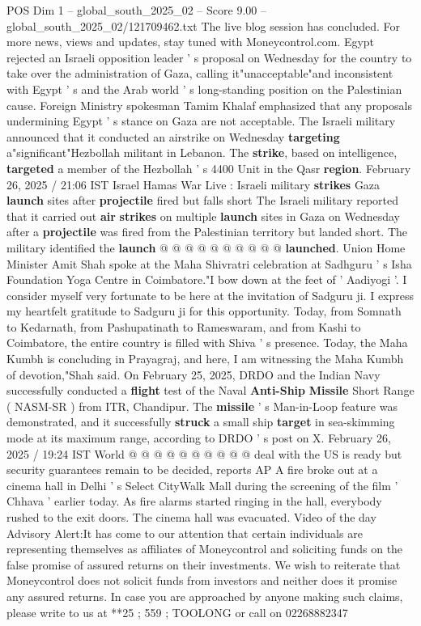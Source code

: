 \begin{textsample}{POS Dim 1 – global\_south\_2025\_02 – Score 9.00 – global\_south\_2025\_02/121709462.txt}  \label{ex:f1_pos_368}
The live blog session has concluded.
For more news, views and updates, stay tuned with Moneycontrol.com.
Egypt rejected an Israeli opposition leader ' s proposal on Wednesday for the country to take over the administration of Gaza, calling it"unacceptable"and inconsistent with Egypt ' s and the Arab world ' s long-standing position on the Palestinian cause.
Foreign Ministry spokesman Tamim Khalaf emphasized that any proposals undermining Egypt ' s stance on Gaza are not acceptable.
The Israeli military announced that it conducted an airstrike on Wednesday \textbf{targeting} a"significant"Hezbollah militant in Lebanon.
The \textbf{strike}, based on intelligence, \textbf{targeted} a member of the Hezbollah ' s 4400 Unit in the Qasr \textbf{region}.
February 26, 2025 / 21:06 IST Israel Hamas War Live : Israeli military \textbf{strikes} Gaza \textbf{launch} sites after \textbf{projectile} fired but falls short The Israeli military reported that it carried out \textbf{air} \textbf{strikes} on multiple \textbf{launch} sites in Gaza on Wednesday after a \textbf{projectile} was fired from the Palestinian territory but landed short.
The military identified the \textbf{launch} @ @ @ @ @ @ @ @ @ @ \textbf{launched}.
Union Home Minister Amit Shah spoke at the Maha Shivratri celebration at Sadhguru ' s Isha Foundation Yoga Centre in Coimbatore."I bow down at the feet of ' Aadiyogi '.
I consider myself very fortunate to be here at the invitation of Sadguru ji.
I express my heartfelt gratitude to Sadguru ji for this opportunity.
Today, from Somnath to Kedarnath, from Pashupatinath to Rameswaram, and from Kashi to Coimbatore, the entire country is filled with Shiva ' s presence.
Today, the Maha Kumbh is concluding in Prayagraj, and here, I am witnessing the Maha Kumbh of devotion,"Shah said.
On February 25, 2025, DRDO and the Indian Navy successfully conducted a \textbf{flight} test of the Naval \textbf{Anti-Ship} \textbf{Missile} Short Range ( NASM-SR ) from ITR, Chandipur.
The \textbf{missile} ' s Man-in-Loop feature was demonstrated, and it successfully \textbf{struck} a small ship \textbf{target} in sea-skimming mode at its maximum range, according to DRDO ' s post on X.
February 26, 2025 / 19:24 IST World @ @ @ @ @ @ @ @ @ @ deal with the US is ready but security guarantees remain to be decided, reports AP A fire broke out at a cinema hall in Delhi ' s Select CityWalk Mall during the screening of the film ' Chhava ' earlier today.
As fire alarms started ringing in the hall, everybody rushed to the exit doors.
The cinema hall was evacuated.
Video of the day Advisory Alert:It has come to our attention that certain individuals are representing themselves as affiliates of Moneycontrol and soliciting funds on the false promise of assured returns on their investments.
We wish to reiterate that Moneycontrol does not solicit funds from investors and neither does it promise any assured returns.
In case you are approached by anyone making such claims, please write to us at **25 ; 559 ; TOOLONG or call on 02268882347

\end{textsample}
